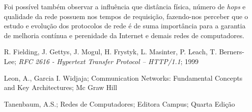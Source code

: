 \documentclass[12pt,a4paper]{report}
\begin{document}
Foi possível também observar a influência que distância física, número de \textit{hops} e qualidade da rede possuem nos tempos de requisição, fazendo-nos perceber que o estudo e evolução dos protocolos de rede é de suma importância para a garantia de melhoria contínua e perenidade da Internet e demais redes de computadores.


\begin{thebibliography}{9}

  R. Fielding, J. Gettys, J. Mogul, H. Frystyk, L. Masinter, P. Leach, T. Berners-Lee; \textit{RFC 2616 - Hypertext Transfer Protocol -- HTTP/1.1}; 1999
  
  Leon, A., Garcia I. Widjaja; Communication Networks: Fundamental Concepts and Key Architectures; Mc Graw Hill
  
  Tanenbaum, A.S.; Redes de Computadores; Editora Campus; Quarta Edição
  
\end{thebibliography}
\end{document}
